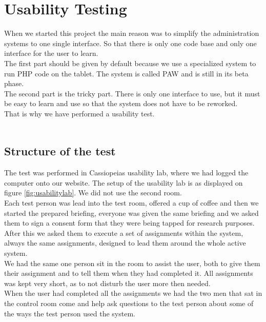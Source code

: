 \chapter{Usability Testing}
When we started this project the main reason was to simplify the administration systems to one single interface. So that there is only one code base and only one interface for the user to learn.\\
The first part should be given by default because we use a specialized system to run PHP code on the tablet. The system is called PAW \citep{paw} and is still in its beta phase.\\
The second part is the tricky part. There is only one interface to use, but it must be easy to learn and use so that the system does not have to be reworked.\\
That is why we have performed a usability test.\\
\\

\section{Structure of the test}
The test was performed in Cassiopeias usability lab, where we had logged the computer onto our website. The setup of the usability lab is as displayed on figure \ref{fig:usabilitylab}. We did not use the second room.\\
Each test person was lead into the test room, offered a cup of coffee and then we started the prepared briefing, everyone was given the same briefing and we asked them to sign a consent form that they were being tapped for research purposes.\\
After this we asked them to execute a set of assignments within the system, always the same assignments, designed to lead them around the whole active system. \\
We had the same one person sit in the room to assist the user, both to give them their assignment and to tell them when they had completed it. All assignments was kept very short, as to not disturb the user more then needed.\\
When the user had completed all the assignments we had the two men that sat in the control room come and help ask questions to the test person about some of the ways the test person used the system.\\
\\

